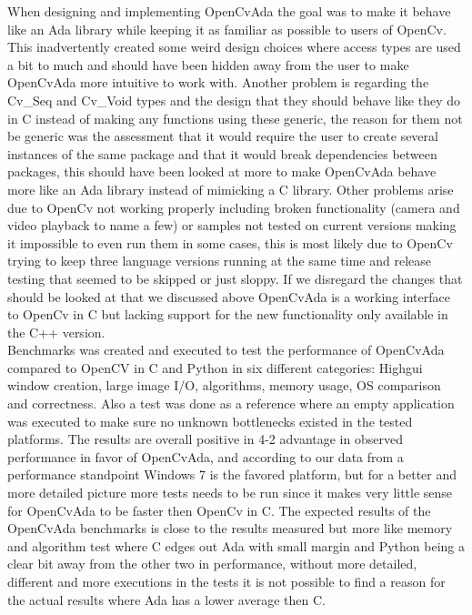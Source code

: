 When designing and implementing OpenCvAda the goal was to make it behave like an Ada library while keeping it as familiar as possible to users of OpenCv. This inadvertently created some weird design choices where access types are used a bit to much and should have been hidden away from the user to make OpenCvAda more intuitive to work with. Another problem is regarding the Cv_Seq and Cv_Void types and the design that they should behave like they do in C instead of making any functions using these generic, the reason for them not be generic was the assessment that it would require the user to create several instances of the same package and that it would break dependencies between packages, this should have been looked at more to make OpenCvAda behave more like an Ada library instead of mimicking a C library. Other problems arise due to OpenCv not working properly including broken functionality (camera and video playback to name a few) or samples not tested on current versions making it impossible to even run them in some cases, this is most likely due to OpenCv trying to keep three language versions running at the same time and release testing that seemed to be skipped or just sloppy. If we disregard the changes that should be looked at that we discussed above OpenCvAda is a working interface to OpenCv in C but lacking support for the new functionality only available in the C++ version. 
\\
Benchmarks was created and executed to test the performance of OpenCvAda compared to OpenCV in C and Python in six different categories: Highgui window creation, large image I/O, algorithms, memory usage, OS comparison and correctness. Also a test was done as a reference where an empty application was executed to make sure no unknown bottlenecks existed in the tested platforms. The results are overall positive in 4-2 advantage in observed performance in favor of OpenCvAda, and according to our data from a performance standpoint Windows 7 is the favored platform, but for a better and more detailed picture more tests needs to be run since it makes very little sense for OpenCvAda to be faster then OpenCv in C. The expected results of the OpenCvAda benchmarks is close to the results measured but more like memory and algorithm test where C edges out Ada with small margin and Python being a clear bit away from the other two in performance, without more detailed, different and more executions in the tests it is not possible to find a reason for the actual results where Ada has a lower average then C. 
\\
